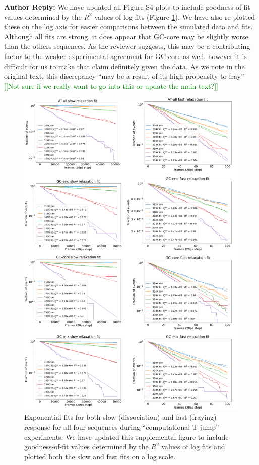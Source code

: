 \documentclass[11pt,a4paper]{letter} %
\newcommand*{\noteg}[1]{\textcolor{green}{[[#1]]}}		%
\begin{document}
\textbf{Author Reply:}     We have updated all Figure S4 plots to include goodness-of-fit values determined by the $R^2$ values of log fits (Figure \ref{fig:goodness-of-fit}). We have also re-plotted these on the log axis for easier comparisons between the simulated data and fits. Although all fits are strong, it does appear that GC-core may be slightly worse than the others sequences. As the reviewer suggests, this may be a contributing factor to the weaker experimental agreement for GC-core as well, however it is difficult for us to make that claim definitely given the data. As we note in the original text, this discrepancy ``may be a result of its high propensity to fray'' \noteg{Not sure if we really want to go into this or update the main text?}

\begin{figure}[ht!]
	\begin{center}
        \includegraphics[width=120mm]{cover_letter/revision_figures/goodness_of_fit.png}
        \caption{Exponential fits for both slow (dissociation) and fast (fraying) response for all four sequences during ``computational T-jump'' experiments. We have updated this supplemental figure to include goodness-of-fit values determined by the $R^2$ values of log fits and plotted both the slow and fast fits on a log scale.}
        \label{fig:goodness-of-fit}
	\end{center}
\end{figure}
\end{document}

